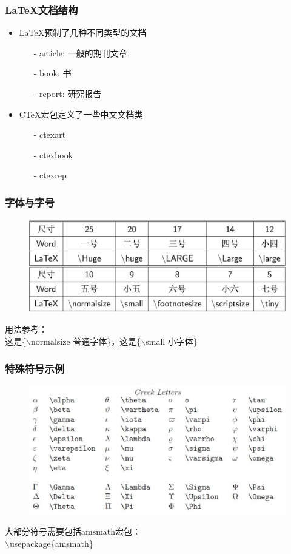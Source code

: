 \documentclass{beamer}
\begin{document}
  \frame
  {
    \frametitle{\LaTeX 文档结构}
    \begin{itemize}
    \item \LaTeX 预制了几种不同类型的文档
      \begin{itemize}
      \item[-] article: 一般的期刊文章
      \item[-] book: 书
      \item[-] report: 研究报告
      \end{itemize}
    \item CTeX宏包定义了一些中文文档类
      \begin{itemize}
      \item[-] ctexart
      \item[-] ctexbook
      \item[-] ctexrep
      \end{itemize}
    \end{itemize}
  }

  \frame
  {
    \frametitle{字体与字号}
    \begin{figure}
    \includegraphics[scale=0.3]{latex_fontsize.pdf}
    \end{figure}

    用法参考：\\
    这是\{$\backslash$normalsize 普通字体\}，这是\{$\backslash$small 小字体\}
  }

  \frame
  {
    \frametitle{特殊符号示例}
    \begin{figure}
    \includegraphics[scale=0.3]{latex_symb.pdf}
    \end{figure}

    大部分符号需要包括amsmath宏包：\\ $\backslash$usepackage\{amsmath\}
  }
\end{document}
